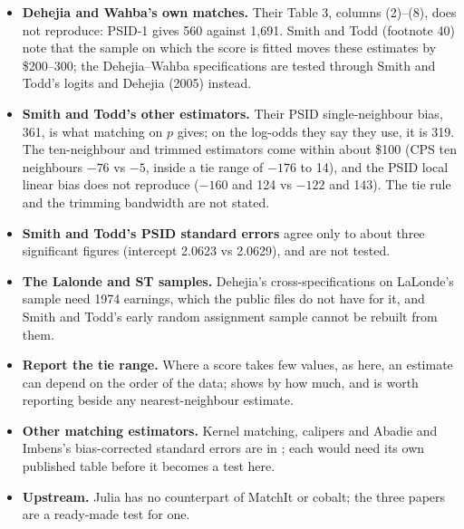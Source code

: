 \begin{itemize}
  \item \textbf{Dehejia and Wahba's own matches.} Their Table 3, columns (2)--(8), does not reproduce: PSID-1 gives 560
    against 1,691. Smith and Todd (footnote 40) note that the sample on which the score is fitted moves these estimates by
    \$200--300; the Dehejia--Wahba specifications are tested through Smith and Todd's logits and Dehejia (2005) instead.
  \item \textbf{Smith and Todd's other estimators.} Their PSID single-neighbour bias, 361, is what matching on $p$ gives;
    on the log-odds they say they use, it is 319. The ten-neighbour and trimmed estimators come within about \$100 (CPS
    ten neighbours $-76$ vs $-5$, inside a tie range of $-176$ to 14), and the PSID local linear bias does not reproduce
    ($-160$ and 124 vs $-122$ and 143). The tie rule and the trimming bandwidth are not stated.
  \item \textbf{Smith and Todd's PSID standard errors} agree only to about three significant figures (intercept 2.0623 vs
    2.0629), and are not tested.
  \item \textbf{The Lalonde and ST samples.} Dehejia's cross-specifications on LaLonde's sample need 1974 earnings, which
    the public files do not have for it, and Smith and Todd's early random assignment sample cannot be rebuilt from them.
\end{itemize}

\begin{itemize}
  \item \textbf{Report the tie range.} Where a score takes few values, as here, an estimate can depend on the order of the
    data;  shows by how much, and is worth reporting beside any nearest-neighbour estimate.
  \item \textbf{Other matching estimators.} Kernel matching, calipers and Abadie and Imbens's bias-corrected standard errors
    are in ; each would need its own published table before it becomes a test here.
  \item \textbf{Upstream.} Julia has no counterpart of MatchIt or cobalt; the three papers are a ready-made test for one.
\end{itemize}

